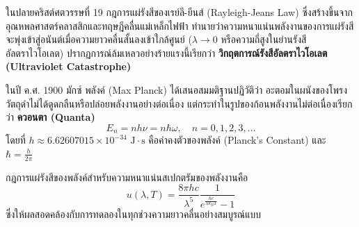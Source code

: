 ในปลายคริสต์ศตวรรษที่ 19 กฎการแผ่รังสีของเรย์ลี-ยีนส์ (Rayleigh-Jeans Law) ซึ่งสร้างขึ้นจากอุณหพลศาสตร์คลาสสิกและทฤษฎีคลื่นแม่เหล็กไฟฟ้า ทำนายว่าความหนาแน่นพลังงานของการแผ่รังสีจะพุ่งเข้าสู่อนันต์เมื่อความยาวคลื่นสั้นลงเข้าใกล้ศูนย์ ($\lambda \to 0$ หรือความถี่สูงในย่านรังสีอัลตราไวโอเลต) ปรากฏการณ์ล้มเหลวอย่างร้ายแรงนี้เรียกว่า \textbf{วิกฤตการณ์รังสีอัลตราไวโอเลต (Ultraviolet Catastrophe)}

ในปี ค.ศ. 1900 มักซ์ พลังค์ (Max Planck) ได้เสนอสมมติฐานปฏิวัติว่า อะตอมในผนังของโพรงวัตถุดำไม่ได้ดูดกลืนหรือปล่อยพลังงานอย่างต่อเนื่อง แต่กระทำในรูปของก้อนพลังงานไม่ต่อเนื่องเรียกว่า \textbf{ควอนตา (Quanta)}
\begin{equation}
E_n = n h \nu = n \hbar \omega, \quad n = 0, 1, 2, 3, \dots
\end{equation}
โดยที่ $h \approx 6.62607015 \times 10^{-34}\text{ J}\cdot\text{s}$ คือค่าคงตัวของพลังค์ (Planck's Constant) และ $\hbar = \frac{h}{2\pi}$ 

กฎการแผ่รังสีของพลังค์สำหรับความหนาแน่นสเปกตรัมของพลังงานคือ
\begin{equation}
u(\lambda, T) = \frac{8\pi h c}{\lambda^5} \frac{1}{e^{\frac{hc}{\lambda k_B T}} - 1}
\end{equation}
ซึ่งให้ผลสอดคล้องกับการทดลองในทุกช่วงความยาวคลื่นอย่างสมบูรณ์แบบ

